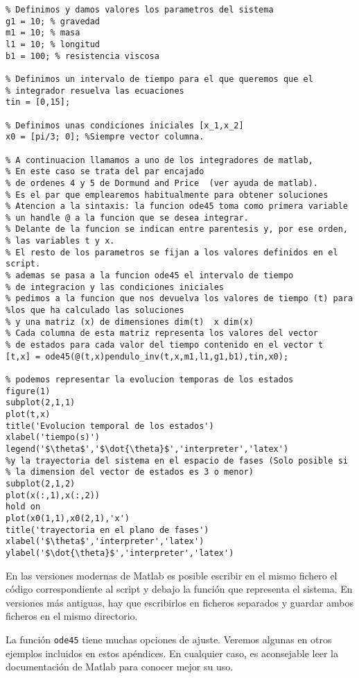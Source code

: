 \begin{lstlisting}
% Definimos y damos valores los parametros del sistema
g1 = 10; % gravedad
m1 = 10; % masa
l1 = 10; % longitud
b1 = 100; % resistencia viscosa

% Definimos un intervalo de tiempo para el que queremos que el
% integrador resuelva las ecuaciones
tin = [0,15];

% Definimos unas condiciones iniciales [x_1,x_2]
x0 = [pi/3; 0]; %Siempre vector columna.

% A continuacion llamamos a uno de los integradores de matlab, 
% En este caso se trata del par encajado 
% de ordenes 4 y 5 de Dormund and Price  (ver ayuda de matlab). 
% Es el par que emplearemos habitualmente para obtener soluciones
% Atencion a la sintaxis: la funcion ode45 toma como primera variable
% un handle @ a la funcion que se desea integrar. 
% Delante de la funcion se indican entre parentesis y, por ese orden,
% las variables t y x.  
% El resto de los parametros se fijan a los valores definidos en el script.
% ademas se pasa a la funcion ode45 el intervalo de tiempo
% de integracion y las condiciones iniciales  
% pedimos a la funcion que nos devuelva los valores de tiempo (t) para 
%los que ha calculado las soluciones
% y una matriz (x) de dimensiones dim(t)  x dim(x) 
% Cada columna de esta matriz representa los valores del vector
% de estados para cada valor del tiempo contenido en el vector t
[t,x] = ode45(@(t,x)pendulo_inv(t,x,m1,l1,g1,b1),tin,x0);

% podemos representar la evolucion temporas de los estados
figure(1)
subplot(2,1,1)
plot(t,x)
title('Evolucion temporal de los estados')
xlabel('tiempo(s)')
legend('$\theta$','$\dot{\theta}$','interpreter','latex')
%y la trayectoria del sistema en el espacio de fases (Solo posible si 
% la dimension del vector de estados es 3 o menor)
subplot(2,1,2)
plot(x(:,1),x(:,2))
hold on
plot(x0(1,1),x0(2,1),'x')
title('trayectoria en el plano de fases')
xlabel('$\theta$','interpreter','latex')
ylabel('$\dot{\theta}$','interpreter','latex')
\end{lstlisting}

En las versiones modernas de Matlab es posible escribir en el mismo fichero el código correspondiente al script  y debajo  la función que representa el sistema. En versiones más antiguas, hay que escribirlos en ficheros separados y guardar ambos ficheros en el mismo directorio.

La función \texttt{ode45} tiene muchas opciones de ajuste. Veremos algunas en otros ejemplos incluidos en estos apéndices. En cualquier caso, es aconsejable leer la documentación de Matlab para conocer mejor su uso.


